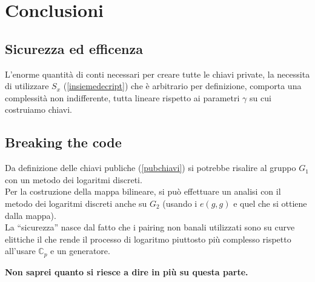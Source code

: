 \chapter{Conclusioni}

\section{Sicurezza ed efficenza}

L'enorme quantità di conti necessari per creare tutte le chiavi private, la necessita di utilizzare $S_x$ (\ref{insiemedecript}) che è arbitrario per definizione, comporta una complessità non indifferente, tutta lineare rispetto ai parametri $\gamma$ su cui costruiamo chiavi.\\

\section{Breaking the code}

Da definizione delle chiavi publiche (\ref{pubchiavi}) si potrebbe risalire al gruppo $G_1$ con un metodo dei logaritmi discreti.\\
Per la costruzione della mappa bilineare, si può effettuare un analisi con il metodo dei logaritmi discreti anche su $G_2$ (usando i $e(g,g)$ e quel che si ottiene dalla mappa).\\
La ``sicurezza'' nasce dal fatto che i pairing non banali utilizzati sono su curve elittiche il che rende il processo di logaritmo piuttosto più complesso rispetto all'usare $\mathbb{C}_p$ e un generatore.

\textbf{Non saprei quanto si riesce a dire in più su questa parte.}